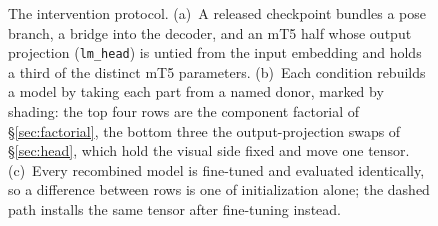 \begin{figure}[t]
\begin{tikzpicture}
\end{tikzpicture}
\caption{The intervention protocol. (a)~A released checkpoint bundles a pose
branch, a bridge into the decoder, and an mT5 half whose output projection
(\texttt{lm\_head}) is untied from the input embedding and holds a third of the
distinct mT5 parameters. (b)~Each condition rebuilds a model by taking each part
from a named donor, marked by shading: the top four rows are the component
factorial of \S\ref{sec:factorial}, the bottom three the output-projection swaps
of \S\ref{sec:head}, which hold the visual side fixed and move one tensor.
(c)~Every recombined model is fine-tuned and evaluated identically, so a
difference between rows is one of initialization alone; the dashed path installs
the same tensor after fine-tuning instead.}
\label{fig:protocol}
\end{figure}

